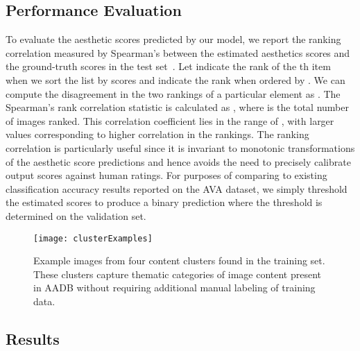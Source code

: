 \documentclass[runningheads]{llncs}
\begin{document}
\subsection{Performance Evaluation}
\label{sec:metrics}

To evaluate the aesthetic scores predicted by our model,
we report the ranking correlation
measured by Spearman's  between the estimated aesthetics scores and the
ground-truth scores in the test set~\cite{myers2010research}.
Let  indicate the rank of the th item when we sort the list by scores
 and  indicate the rank when ordered by .
We can compute the disagreement in the two rankings of a particular element 
as .  The Spearman's  rank correlation statistic is
calculated as ,
where  is the total number of images ranked.  This correlation coefficient
lies in the range of , with larger values corresponding to higher
correlation in the rankings.  The ranking correlation is particularly useful
since it is invariant to monotonic transformations of the aesthetic score
predictions and hence avoids the need to precisely calibrate output scores
against human ratings.
For purposes of comparing to existing classification accuracy results reported
on the AVA dataset, we simply threshold the estimated scores 
to produce a binary prediction where the threshold  is determined on the validation set.






\begin{figure}[t]
\centering
\texttt{[image: clusterExamples]}
\vspace{-1mm}
   \caption{Example images from four content clusters found in the training
   set.  These clusters capture thematic categories of image content present in
   AADB without requiring additional manual labeling of training data.}
\label{fig:cluster}
\vspace{-2mm}
\end{figure}







\subsection{Results}
\label{ssec:results}
\end{document}
